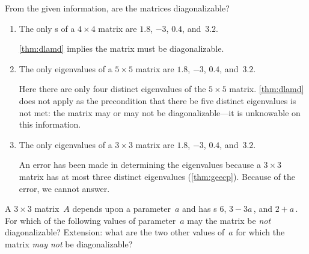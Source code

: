 \begin{example} 
From the given information, are the matrices diagonalizable?
\begin{enumerate}
\item The only s of a \(4\times 4\) matrix are \(1.8\), \(-3\), \(0.4\), and~\(3.2\).
\begin{solution} 
\cref{thm:dlamd} implies the matrix must be diagonalizable.
\end{solution}

\item The only eigenvalues of a \(5\times 5\) matrix are \(1.8\), \(-3\), \(0.4\), and~\(3.2\).
\begin{solution} 
Here there are only four distinct eigenvalues of the \(5\times5\) matrix.
\cref{thm:dlamd} does not apply as the precondition that there be five distinct eigenvalues is not met: the matrix may or may not be diagonalizable---it is unknowable on this information.
\end{solution}

\item The only eigenvalues of a \(3\times 3\) matrix are \(1.8\), \(-3\), \(0.4\), and~\(3.2\).
\begin{solution} 
An error has been made in determining the eigenvalues because a \(3\times3\) matrix has at most three distinct eigenvalues (\cref{thm:geecp}).
Because of the error, we cannot answer.
\end{solution}

\end{enumerate}
\end{example}



\begin{activity}
A \(3\times3\) matrix~\(A\) depends upon a parameter~\(a\) and has s \(6\), \(3-3a\)\,, and \(2+a\)\,.
For which of the following values of parameter~\(a\) may the matrix be \emph{not} diagonalizable?
Extension: what are the two other values of~\(a\) for which the matrix \emph{may not} be diagonalizable?
\end{activity}





